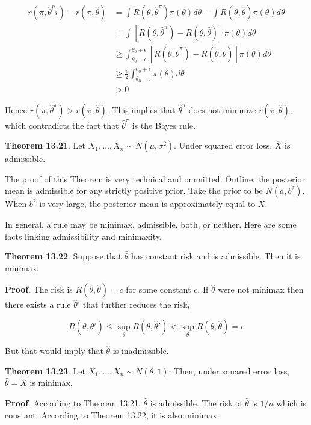 \begin{align*}
r(\pi, \hat{\theta}^pi) - r(\pi, \hat{\theta}) &= \int R(\theta, \hat{\theta}^\pi) \pi(\theta) d\theta - \int R(\theta, \hat{\theta}) \pi(\theta) d\theta \\
&= \int \left[ R(\theta, \hat{\theta}^\pi) - R(\theta, \hat{\theta})\right] \pi(\theta) d\theta \\
&\geq \int_{\theta_{0} - \epsilon}^{\theta_{0} + \epsilon} \left[ R(\theta, \hat{\theta}^\pi) - R(\theta, \hat{\theta})\right] \pi(\theta) d\theta \\
& \geq \frac{v}{2} \int_{\theta_{0} - \epsilon}^{\theta_{0} + \epsilon} \pi(\theta) d\theta \\
& > 0
\end{align*}

Hence \(r(\pi, \hat{\theta}^\pi) > r(\pi, \hat{\theta})\). This implies
that \(\hat{\theta}^\pi\) does not minimize \(r(\pi, \hat{\theta})\),
which contradicts the fact that \(\hat{\theta}^\pi\) is the Bayes rule.

\textbf{Theorem 13.21}. Let \(X_{1}, \dots, X_{n} \sim N(\mu, \sigma^{2})\).
Under squared error loss, \(\overline{X}\) is admissible.

The proof of this Theorem is very technical and ommitted. Outline: the
posterior mean is admissible for any strictly positive prior. Take the
prior to be \(N(a, b^{2})\). When \(b^{2}\) is very large, the posterior
mean is approximately equal to \(\overline{X}\).

In general, a rule may be minimax, admissible, both, or neither. Here
are some facts linking admissibility and minimaxity.

\textbf{Theorem 13.22}. Suppose that \(\hat{\theta}\) has constant risk
and is admissible. Then it is minimax.

\textbf{Proof}. The risk is \(R(\theta, \hat{\theta}) = c\) for some
constant \(c\). If \(\hat{\theta}\) were not minimax then there exists a
rule \(\hat{\theta}'\) that further reduces the risk,

\[R(\theta, \hat{\theta}') \leq \sup_{\theta} R(\theta, \hat{\theta}') < \sup_{\theta} R(\theta, \hat{\theta}) = c\]

But that would imply that \(\hat{\theta}\) is inadmissible.

\textbf{Theorem 13.23}. Let \(X_{1}, \dots, X_{n} \sim N(\theta, 1)\). Then,
under squared error loss, \(\hat{\theta} = \overline{X}\) is minimax.

\textbf{Proof}. According to Theorem 13.21, \(\hat{\theta}\) is
admissible. The risk of \(\hat{\theta}\) is \(1/n\) which is constant.
According to Theorem 13.22, it is also minimax.


